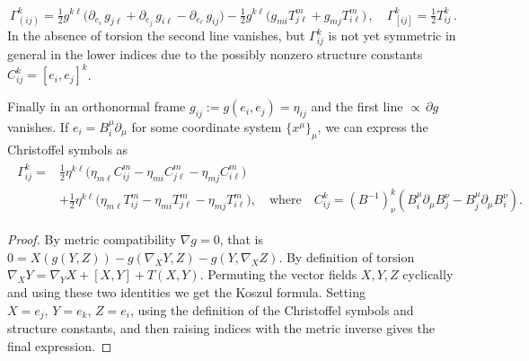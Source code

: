 \documentclass[../geometry_main.tex]{subfiles}
\begin{document}
\begin{mytheorem}
\begin{equation}
    \Gamma_{(ij)}^k=\tfrac{1}{2} g^{k\ell} \Big( \partial_{e_i}\,g_{j \ell} + \partial_{e_j}\,g_{i \ell} - \partial_{e_\ell}\,g_{i j}\Big) - \tfrac{1}{2} g^{k\ell} \Big( g_{m i} T^m_{j \ell} + g_{m j} T^m_{i \ell}  \Big)\,,
    \quad \Gamma_{[ij]}^k = \tfrac{1}{2} T^k_{ij}\,.
\end{equation}
In the absence of torsion the second line vanishes, but $\Gamma_{ij}^k$ is not yet symmetric in general in the lower indices due to the possibly nonzero structure constants $C_{ij}^k=[e_i,e_j]^k$.

Finally in an orthonormal frame $g_{ij}:=g(e_i,e_j) = \eta_{ij}$ and the first line $\propto \, \partial g$ vanishes.
If $e_i=B_i^\mu\partial_\mu$ for some coordinate system $\{x^\mu\}_\mu$, we can express the Christoffel symbols as
\begin{align}
\begin{aligned}
    \Gamma_{ij}^k=&\tfrac{1}{2} \eta^{k\ell} \Big( \eta_{m \ell} C^m_{ij}  - \eta_{m i} C^m_{j \ell} - \eta_{m j} C^m_{i \ell}\Big) \\
    & +\tfrac{1}{2} \eta^{k\ell} \Big( \eta_{m \ell} T^m_{ij} -\eta_{m i} T^m_{j \ell} - \eta_{m j} T^m_{i \ell}  \Big),\quad \text{where}\quad C_{ij}^k= (B^{-1})^k_\nu \left( B_i^\mu \partial_\mu B_j^\nu - B_j^\mu \partial_\mu B_i^\nu \right).
\end{aligned}
\end{align}
\end{mytheorem}
\begin{proof}
By metric compatibility $\nabla g=0$, that is $0=X(g(Y,Z)) - g(\nabla_X Y,Z) - g(Y, \nabla_X Z)$.
By definition of torsion $\nabla_X Y = \nabla_Y X + [X,Y] + T(X,Y)$.
Permuting the vector fields $X,Y,Z$ cyclically and using these two identities we get the Koszul formula.
Setting \(X=e_j,\, Y=e_k,\, Z=e_i\), using the definition of the Christoffel symbols and structure constants, and then raising indices with the metric inverse gives the final expression.
\end{proof}
\end{document}
